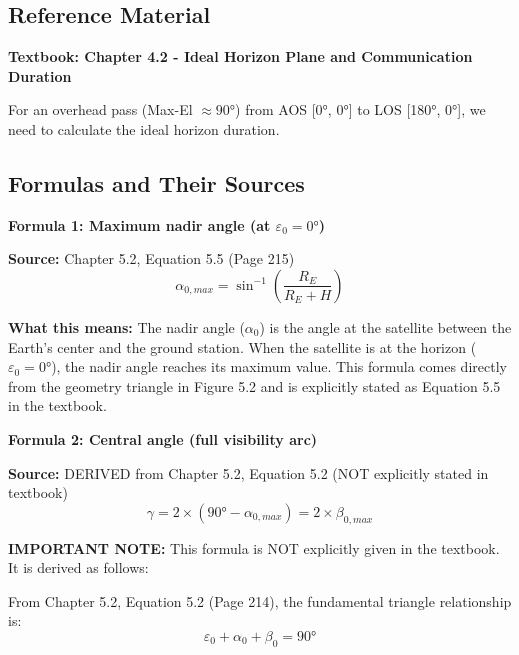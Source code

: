\documentclass[11pt,letterpaper]{article}
\begin{document}
\subsection{Reference Material}
\textbf{Textbook: Chapter 4.2 - Ideal Horizon Plane and Communication Duration}

For an overhead pass (Max-El $\approx 90°$) from AOS [0°, 0°] to LOS [180°, 0°], we need to calculate the ideal horizon duration.

\subsection{Formulas and Their Sources}

\textbf{Formula 1: Maximum nadir angle (at $\varepsilon_0 = 0°$)}

\textbf{Source:} Chapter 5.2, Equation 5.5 (Page 215)
\begin{equation}
\alpha_{0,max} = \sin^{-1}\left(\frac{R_E}{R_E + H}\right)
\end{equation}

\textbf{What this means:} The nadir angle ($\alpha_0$) is the angle at the satellite between the Earth's center and the ground station. When the satellite is at the horizon ($\varepsilon_0 = 0°$), the nadir angle reaches its maximum value. This formula comes directly from the geometry triangle in Figure 5.2 and is explicitly stated as Equation 5.5 in the textbook.

\vspace{0.3cm}

\textbf{Formula 2: Central angle (full visibility arc)}

\textbf{Source:} DERIVED from Chapter 5.2, Equation 5.2 (NOT explicitly stated in textbook)
\begin{equation}
\gamma = 2 \times (90° - \alpha_{0,max}) = 2 \times \beta_{0,max}
\end{equation}

\textbf{IMPORTANT NOTE:} This formula is NOT explicitly given in the textbook. It is derived as follows:

From Chapter 5.2, Equation 5.2 (Page 214), the fundamental triangle relationship is:
\begin{equation}
\varepsilon_0 + \alpha_0 + \beta_0 = 90°
\end{equation}
\end{document}
